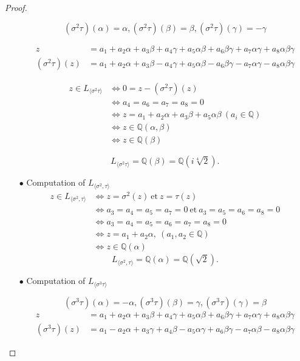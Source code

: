 \documentclass[11pt,a4paper]{article}
\newcommand{\Q}{\mathbb{Q}}
\begin{document}
\begin{proof}
\begin{enumerate}
$$( \sigma^2\tau)(\alpha) = \alpha, (\sigma^2\tau)(\beta) = \beta, (\sigma^2\tau)(\gamma) = -\gamma$$

\begin{align*}
z &= a_1+a_2 \alpha + a_3 \beta + a_4 \gamma + a_5 \alpha \beta + a_6 \beta \gamma + a_7 \alpha \gamma + a_8 \alpha \beta \gamma\\
(\sigma^2\tau)(z) &= a_1+a_2\alpha +a_3 \beta -a_4 \gamma +a_5 \alpha \beta - a_6 \beta \gamma -a_7 \alpha \gamma -a_8 \alpha \beta \gamma
\end{align*}

\begin{align*}
z \in L_{\langle \sigma^2\tau \rangle} &\iff 0 = z -(\sigma^2\tau)(z)\\
&\iff a_4 = a_6 = a_7 = a_8 = 0\\
&\iff z = a_1+a_2 \alpha + a_3 \beta  + a_5 \alpha  \beta  \ (a_i \in \Q)\\
&\iff z \in \Q(\alpha,\beta)\\
&\iff z \in \Q(\beta)
\end{align*}

$$L_{\langle  \sigma^2\tau \rangle} = \Q(\beta) = \Q(i\sqrt[4]{2}).$$


\item[$\bullet$] Computation of $L_{\langle \sigma^2, \tau  \rangle}$
\begin{align*}
z\in L_{\langle \sigma^2, \tau  \rangle}&\iff z = \sigma^2(z)\ \mathrm{et}\ z=\tau(z)\\
&\iff a_3=a_4=a_5=a_7=0 \ \mathrm{et}\  a_3=a_5=a_6=a_8=0\\
&\iff a_3=a_4=a_5=a_6=a_7=a_8=0\\
&\iff z =a_1+a_2\alpha, \ (a_1,a_2 \in \Q)\\
&\iff z \in \Q(\alpha)
\end{align*}
$$L_{\langle \sigma^2, \tau  \rangle} = \Q(\alpha) = \Q(\sqrt{2}).$$


\item[$\bullet$] Computation of $L_{\langle  \sigma^3 \tau \rangle}$

$$(\sigma^3 \tau)(\alpha) = -\alpha, (\sigma^3 \tau)(\beta) = \gamma, (\sigma^3 \tau)(\gamma) = \beta$$
\begin{align*}
z &= a_1+a_2 \alpha + a_3 \beta + a_4 \gamma + a_5 \alpha \beta + a_6 \beta \gamma + a_7 \alpha \gamma + a_8 \alpha \beta \gamma\\
(\sigma^3 \tau)(z) &= a_1-a_2\alpha +a_3 \gamma +a_4 \beta -a_5 \alpha \gamma + a_6 \beta \gamma -a_7 \alpha \beta -a_8 \alpha \beta \gamma
\end{align*}


\end{enumerate}
\end{proof}
\end{document}
